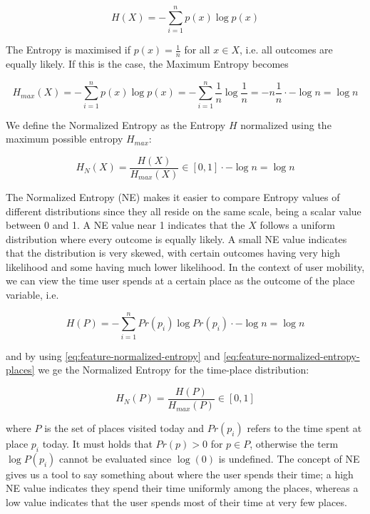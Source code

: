 \begin{equation}
\label{eq:feature-entropy}
H(X) = -\sum_{i=1}^{n} p(x) \log p(x)
\end{equation}

The Entropy is maximised if $p(x) = \frac{1}{n}$ for all $x \in X$, i.e. all outcomes are equally likely. If this is the case, the Maximum Entropy becomes 

\begin{equation}
\label{eq:feature-entropy-max}
H_{max}(X) = - \sum_{i=1}^{n} p(x) \log p(x) = - \sum_{i=1}^{n} \frac{1}{n} \log \frac{1}{n} = -n \frac{1}{n} \cdot -\log n = \log n 
\end{equation}

We define the Normalized Entropy as the Entropy $H$ normalized using the maximum possible entropy $H_{max}$:

\begin{equation}
\label{eq:feature-normalized-entropy}
H_N(X) = \frac{H(X)}{H_{max}(X)} \in [0,1]
\cdot -\log n = \log n 
\end{equation}

The Normalized Entropy (NE) makes it easier to compare Entropy values of different distributions since they all reside on the same scale, being a scalar value between  0 and 1. A NE value near 1 indicates that the $X$ follows a uniform distribution where every outcome is equally likely. A small NE value indicates that the distribution is very skewed, with certain outcomes having very high likelihood and some having much lower likelihood.  In the context of user mobility, we can view the time user spends at a certain place as the outcome of the place variable, i.e. 

\begin{equation}
\label{eq:feature-normalized-entropy-places}
H(P) = - \sum_{i=1}^{n} Pr(p_i) \log Pr(p_i)
\cdot -\log n = \log n 
\end{equation}

and by using \eqref{eq:feature-normalized-entropy} and \eqref{eq:feature-normalized-entropy-places} we ge the Normalized Entropy for the time-place distribution:

\begin{equation}
\label{eq:feature-normalized-entropy}
H_N(P) = \frac{H(P)}{H_{max}(P)} \in [0,1]
\end{equation}

where $P$ is the set of places visited today and $Pr(p_i)$ refers to the time spent at place $p_i$ today. It must holds that $Pr(p) > 0$ for $p \in P$, otherwise the term $\log P(p_i)$ cannot be evaluated since $\log(0)$ is undefined. The concept of NE gives us a tool to say something about where the user spends their time; a high NE value indicates they spend their time uniformly among the places, whereas a low value indicates that the user spends most of their time at very few places. 

